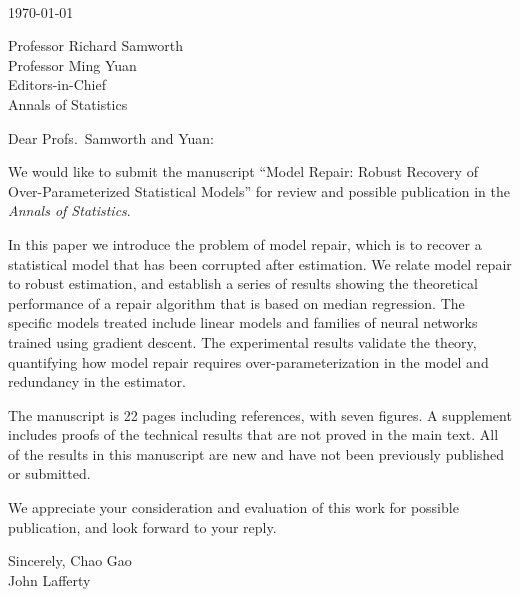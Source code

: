 \documentclass[11pt]{article}
\begin{document}
\thispagestyle{empty}
\mbox{\ }
\vskip1in

\today{}

Professor Richard Samworth\\
Professor Ming Yuan\\
Editors-in-Chief\\
Annals of Statistics
\vskip10pt

Dear Profs.~Samworth and Yuan:

We would like to submit the manuscript ``Model Repair: Robust Recovery of Over-Parameter\-ized Statistical Models'' for review and
possible publication in the {\it Annals of Statistics}.

In this paper we introduce the problem of model repair, which is
to recover a statistical model that has been corrupted after estimation. We relate
model repair to robust estimation, and establish a series of results showing the theoretical performance of a repair algorithm that is based on median regression. The specific models treated include linear models and families of neural networks trained using gradient descent. The experimental results validate the theory, quantifying how model repair requires over-parameterization in the model and redundancy in the estimator.

The manuscript is 22 pages including references, with seven figures.  A supplement includes
proofs of the technical results that are not proved in the main text. All of the
results in this manuscript are new and have not been previously published or submitted.

We appreciate your consideration and evaluation of this work for possible
publication, and look forward to your reply.

Sincerely,
\vskip5pt
Chao Gao\\
John Lafferty
\end{document}
